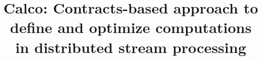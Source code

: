 \documentclass[sigconf]{acmart}
\theoremstyle{remark}
\begin{document}

\title {Calco: Contracts-based approach to define and optimize computations in distributed stream processing}

\end{document}
